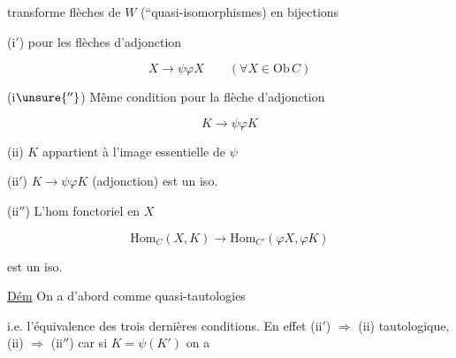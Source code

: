 transforme flèches de $W$ (``quasi-isomorphismes) en bijections

(i$'$)   pour les flèches d'adjonction

\[
 X\longrightarrow\psi\varphi X\qquad(\forall X\in\mathrm{Ob}\,C)
\]

(i$\unsure{''}$) Même condition pour la flèche d'adjonction

\[
 K\longrightarrow\psi\varphi K
\]


(ii) $K$ appartient à l'image essentielle de $\psi$

(ii$'$) $K\longrightarrow\psi\varphi K$ (adjonction) est un iso.

(ii$''$) L'hom fonctoriel en $X$

\[
 \mathrm{Hom}_C(X,K)\longrightarrow\mathrm{Hom}_{C'}(\varphi X,\varphi K)
\]

est un iso.

\uline{Dém} On a d'abord comme quasi-tautologies


i.e. l'équivalence des trois dernières conditions. En effet (ii$'$) $\Longrightarrow$ (ii) tautologique, (ii) $\Longrightarrow$ (ii$''$) car si $K=\psi(K')$ on a

